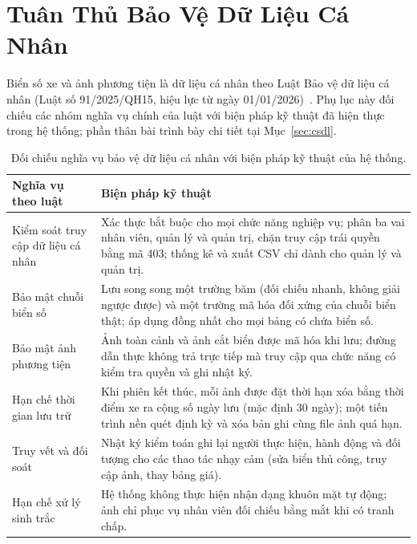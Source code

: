 \chapter{Tuân Thủ Bảo Vệ Dữ Liệu Cá Nhân}
\label{app:baomat}

Biển số xe và ảnh phương tiện là dữ liệu cá nhân theo Luật Bảo vệ dữ liệu cá nhân (Luật số
91/2025/QH15, hiệu lực từ ngày 01/01/2026)~\autocite{vn2025lutbvdlcn}. Phụ lục này đối chiếu
các nhóm nghĩa vụ chính của luật với biện pháp kỹ thuật đã hiện thực trong hệ thống; phần
thân bài trình bày chi tiết tại Mục~\ref{sec:csdl}.

\begin{table}[htbp]
\centering
\caption{Đối chiếu nghĩa vụ bảo vệ dữ liệu cá nhân với biện pháp kỹ thuật của hệ thống.}
\label{tab:baomat-mapping}

\vspace{4pt}
\begin{tabular}{p{4cm}p{9cm}}
\toprule
\textbf{Nghĩa vụ theo luật} & \textbf{Biện pháp kỹ thuật} \\
\midrule
Kiểm soát truy cập dữ liệu cá nhân &
  Xác thực bắt buộc cho mọi chức năng nghiệp vụ; phân ba vai nhân viên, quản lý và quản trị, chặn truy cập trái quyền bằng mã 403; thống kê và xuất CSV chỉ dành cho quản lý và quản trị. \\
\midrule
Bảo mật chuỗi biển số &
  Lưu song song một trường băm (đối chiếu nhanh, không giải ngược được) và một trường mã hóa đối xứng của chuỗi biển thật; áp dụng đồng nhất cho mọi bảng có chứa biển số. \\
\midrule
Bảo mật ảnh phương tiện &
  Ảnh toàn cảnh và ảnh cắt biển được mã hóa khi lưu; đường dẫn thực không trả trực tiếp mà truy cập qua chức năng có kiểm tra quyền và ghi nhật ký. \\
\midrule
Hạn chế thời gian lưu trữ &
  Khi phiên kết thúc, mỗi ảnh được đặt thời hạn xóa bằng thời điểm xe ra cộng số ngày lưu (mặc định 30 ngày); một tiến trình nền quét định kỳ và xóa bản ghi cùng file ảnh quá hạn. \\
\midrule
Truy vết và đối soát &
  Nhật ký kiểm toán ghi lại người thực hiện, hành động và đối tượng cho các thao tác nhạy cảm (sửa biển thủ công, truy cập ảnh, thay bảng giá). \\
\midrule
Hạn chế xử lý sinh trắc &
  Hệ thống không thực hiện nhận dạng khuôn mặt tự động; ảnh chỉ phục vụ nhân viên đối chiếu bằng mắt khi có tranh chấp. \\
\bottomrule
\end{tabular}
\end{table}

